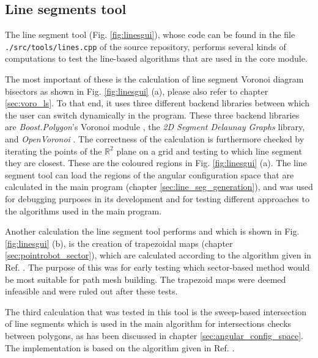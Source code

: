 \subsection{Line segments tool}
\label{sec:tests_linesegs}
The line segment tool (Fig. \ref{fig:linesgui}), whose code can be found in the file 
\lstinline|./src/tools/lines.cpp| of the source repository, 
performs several kinds of computations to test the line-based algorithms that are used in the core module.

The most important of these is the calculation of line segment Voronoi diagram bisectors as shown in 
Fig. \ref{fig:linesgui} (a), please also refer to chapter \ref{sec:voro_ls}.
To that end, it uses three different backend libraries between which the user can switch dynamically in
the program. These three backend libraries are \textit{Boost.Polygon}'s Voronoi module \cite{web_boost_polygon_voronoi},
the \textit{2D Segment Delaunay Graphs} \cite{web_2dsegdel} library, and \textit{OpenVoronoi} \cite{web_openvoronoi}.
The correctness of the calculation is furthermore checked by iterating the points of the $\mathbb{R}^2$ plane
on a grid and testing to which line segment they are closest. These are the coloured regions in Fig. \ref{fig:linesgui} (a).
The line segment tool can load the regions of the angular configuration space that are calculated in the main
program (chapter \ref{sec:line_seg_generation}), and was used for debugging purposes in its development and
for testing different approaches to the algorithms used in the main program.

Another calculation the line segment tool performs and which is shown in Fig. \ref{fig:linesgui} (b), is the 
creation of trapezoidal maps (chapter \ref{sec:pointrobot_sector}), which are calculated according to the 
algorithm given in Ref. \cite[Ch. 6, pp. 121-146]{Berg2008}.
The purpose of this was for early testing which sector-based method would be most suitable
for path mesh building. The trapezoid maps were deemed infeasible and were ruled out after
these tests.

The third calculation that was tested in this tool is the sweep-based intersection of line segments which
is used in the main algorithm for intersections checks between polygons, as has been discussed in 
chapter \ref{sec:angular_config_space}.
The implementation is based on the algorithm given in Ref. \cite[Ch. 2, pp. 69-80]{FUH_geo2020}.

